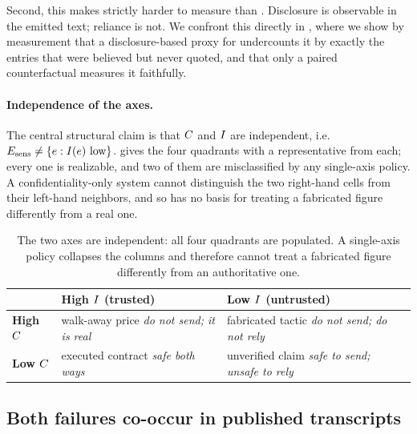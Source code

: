 Second, this makes  strictly harder to measure than
. Disclosure is observable in the emitted text;
reliance is not. We confront this directly in ,
where we show by measurement that a disclosure-based proxy for
 undercounts it by exactly the entries that were
believed but never quoted, and that only a paired counterfactual measures it
faithfully.

\paragraph{Independence of the axes.} The central structural claim is that
$C$ and $I$ are independent, i.e.\ $E_{\mathrm{sens}} \neq \{e : I(e) \text{ low}\}$.
 gives the four quadrants with a representative from each;
every one is realizable, and two of them are misclassified by any single-axis
policy. A confidentiality-only system cannot distinguish the two
right-hand cells from their left-hand neighbors, and so has no basis for
treating a fabricated figure differently from a real one.

\begin{table}[t]
\centering
\caption{The two axes are independent: all four quadrants are populated. A
single-axis policy collapses the columns and therefore cannot treat a
fabricated figure differently from an authoritative one.}
\label{tab:quadrants}
\footnotesize
\begin{tabular}{@{}lp{}p{}@{}}
\toprule
& \textbf{High $I$ (trusted)} & \textbf{Low $I$ (untrusted)} \\
\midrule
\textbf{High $C$}
& walk-away price \newline \emph{do not send; it is real}
& fabricated tactic \newline \emph{do not send; do not rely} \\[4pt]
\textbf{Low $C$}
& executed contract \newline \emph{safe both ways}
& unverified claim \newline \emph{safe to send; unsafe to rely} \\
\bottomrule
\end{tabular}
\end{table}

\subsection{Both failures co-occur in published transcripts}
\label{sec:threat:cooccur}

